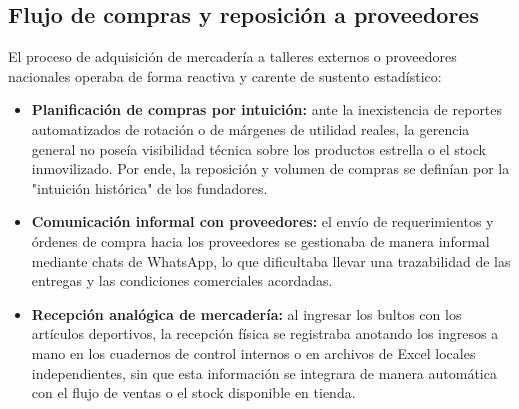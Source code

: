 \subsection{Flujo de compras y reposición a proveedores}
\begin{indentedsubsection}
El proceso de adquisición de mercadería a talleres externos o proveedores nacionales operaba de forma reactiva y carente de sustento estadístico:

\begin{itemize}
    \item \textbf{Planificación de compras por intuición:} ante la inexistencia de reportes automatizados de rotación o de márgenes de utilidad reales, la gerencia general no poseía visibilidad técnica sobre los productos estrella o el stock inmovilizado. Por ende, la reposición y volumen de compras se definían por la "intuición histórica" de los fundadores.
    \item \textbf{Comunicación informal con proveedores:} el envío de requerimientos y órdenes de compra hacia los proveedores se gestionaba de manera informal mediante chats de WhatsApp, lo que dificultaba llevar una trazabilidad de las entregas y las condiciones comerciales acordadas.
    \item \textbf{Recepción analógica de mercadería:} al ingresar los bultos con los artículos deportivos, la recepción física se registraba anotando los ingresos a mano en los cuadernos de control internos o en archivos de Excel locales independientes, sin que esta información se integrara de manera automática con el flujo de ventas o el stock disponible en tienda.
\end{itemize}
\end{indentedsubsection}

